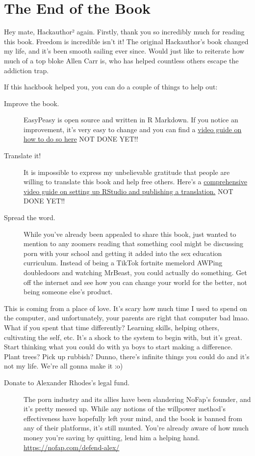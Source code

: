 \documentclass[
]{book}
\begin{document}
\hypertarget{the-end-of-the-book}{%
\chapter{The End of the Book}\label{the-end-of-the-book}}

Hey mate, Hackauthor² again. Firstly, thank you so incredibly much for reading this book. Freedom is incredible isn't it! The original Hackauthor's book changed my life, and it's been smooth sailing ever since. Would just like to reiterate how much of a top bloke Allen Carr is, who has helped countless others escape the addiction trap.

If this hackbook helped you, you can do a couple of things to help out:

\begin{description}
\item[Improve the book.]
EasyPeasy is open source and written in R Markdown. If you notice an improvement, it's very easy to change and you can find a \href{}{video guide on how to do so here} NOT DONE YET!!
\item[Translate it!]
It is impossible to express my unbelievable gratitude that people are willing to translate this book and help free others. Here's a \href{}{comprehensive video guide on setting up RStudio and publishing a translation.} NOT DONE YET!!
\item[Spread the word.]
While you've already been appealed to share this book, just wanted to mention to any zoomers reading that something cool might be discussing porn with your school and getting it added into the sex education curriculum. Instead of being a TikTok fortnite memelord AWPing doubledoors and watching MrBeast, you could actually do something. Get off the internet and see how you can change your world for the better, not being someone else's product.
\end{description}

This is coming from a place of love. It's scary how much time I used to spend on the computer, and unfortunately, your parents are right that computer bad lmao. What if you spent that time differently? Learning skills, helping others, cultivating the self, etc. It's a shock to the system to begin with, but it's great. Start thinking what you could do with ya boys to start making a difference. Plant trees? Pick up rubbish? Dunno, there's infinite things you could do and it's not my life. We're all gonna make it :o)

\begin{description}
\item[Donate to Alexander Rhodes's legal fund.]
The porn industry and its allies have been slandering NoFap's founder, and it's pretty messed up. While any notions of the willpower method's effectiveness have hopefully left your mind, and the book is banned from any of their platforms, it's still munted. You're already aware of how much money you're saving by quitting, lend him a helping hand. \url{https://nofap.com/defend-alex/}
\end{description}
\end{document}
